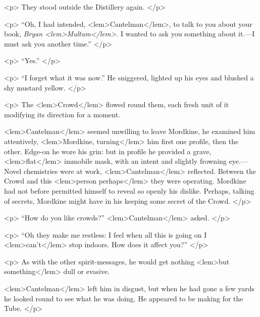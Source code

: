 {{				<p>
				They stood outside the Distillery again. 
 				</p> 

				<p>
				“Oh, I had intended, 
<lem>Cantelman</lem>{}, to talk to you about your book, 
				\emph{Bryan 
<lem>Multum</lem>{}.} 
				I wanted 
to ask you something about it.---I must ask you another time.” 
				</p> 

				<p>
				“Yes.” 
 				</p> 

				<p>
				“I forget what it was now.” He sniggered, lighted up his eyes and blushed a shy mustard 
				yellow. 
 				</p> 

				<p>
				The 
<lem>Crowd</lem>{} flowed round them, each fresh unit of it modifying its direction for a moment. 
				
<lem>Cantelman</lem>{} seemed unwilling to leave Mordkine, he examined him attentively, 
<lem>Mordkine, turning</lem>
					{}
				him first one profile, then the other. Edge-on he wore his grin: but in profile 
				he provided a grave, 
<lem>flat</lem>
					{} 
				immobile mask, with an intent and slightly frowning eye.---Novel 
				chemistries were at work, 
<lem>Cantelman</lem>{} reflected. Between the Crowd and this 
<lem>person perhaps</lem>
					{} 
				they were operating. Mordkine had not before permitted himself to reveal so 
				openly his dislike. 
					{} 
				Perhaps, talking of secrets, 
				Mordkine might have in his keeping some secret of the Crowd. 
 				</p> 

				<p>
				“How do you like crowds?” 
<lem>Cantelman</lem>{} asked. 
 				</p> 

				<p>
				“Oh they make me restless: I feel when all this is going on I 
<lem>can't</lem>{} stop indoors. How does 
				it affect you?” 
 				</p> 

				<p>
				As with the other spirit-messages, he would get nothing 
<lem>but something</lem>
					{} 
				dull or evasive. 
				
<lem>Cantelman</lem>{} left him in disgust, but when he had gone a few yards he looked round to see 
				what he was doing. He appeared to be making for the Tube. 
 				</p> 

}}
